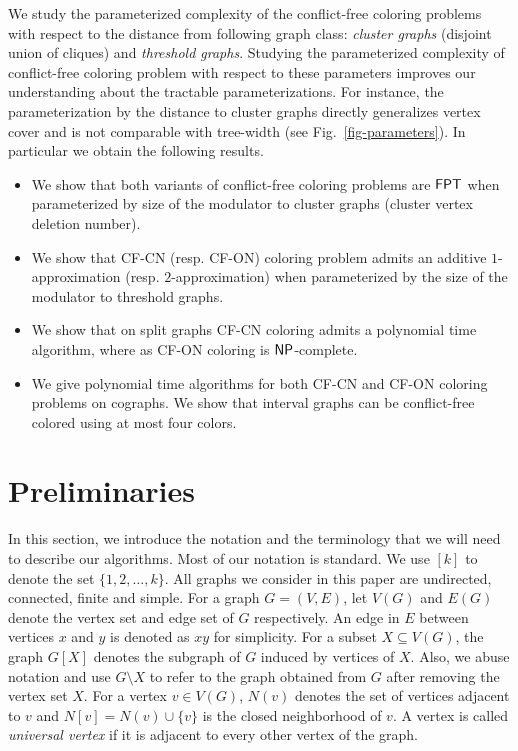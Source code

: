 \documentclass[svgnames]{llncs}
\newcommand{\NP}{\ensuremath{\sf{NP}}\xspace}
\newcommand{\fpt}{\ensuremath{\sf{FPT}}\xspace}
\newcommand{\cfcn}{\textsc {CF-CN}}
\newcommand{\cfon}{\textsc {CF-ON}}
\begin{document}
We study the parameterized complexity of the conflict-free coloring problems with respect to the distance from following graph class: \emph{cluster graphs} (disjoint union of cliques) and \emph{threshold graphs}. 
Studying the parameterized complexity of conflict-free coloring problem with respect to these parameters improves our understanding about the tractable parameterizations. 
For instance, the parameterization by the distance to cluster graphs directly generalizes vertex cover and is not comparable with tree-width (see Fig.~\ref{fig-parameters}). 
In particular we obtain the following results.
\vspace{-0.2cm}
\begin{itemize}
\item We show that both variants of conflict-free coloring problems are \fpt{} when parameterized by size of the modulator to cluster graphs (cluster vertex deletion number).
\item We show that \cfcn{} (resp. \cfon{}) coloring problem admits an additive $1$-approximation (resp. $2$-approximation) when parameterized by the size of the modulator to threshold graphs.
\item We show that on split graphs \cfcn{} coloring admits a polynomial time algorithm, where as \cfon{} coloring is $\NP$-complete.
\item We give polynomial time algorithms for both  \cfcn{} and \cfon{} coloring problems on cographs.
We show that interval graphs can be conflict-free colored using at most four colors.  
\end{itemize}

\section{Preliminaries}

In this section, we introduce the notation and the terminology that we will need to describe our algorithms. Most of our notation is standard. We use $[k]$ to denote the set $\{1,2,\ldots,k\}$. All graphs we consider in this paper are undirected, connected, finite and simple.
For a  graph $G=(V,E)$, let $V(G)$ and $E(G)$ denote the vertex set and edge set of $G$ respectively.
An edge in $E$ between vertices $x$ and $y$ is denoted as $xy$ for simplicity. 
For a  subset $X \subseteq V(G)$, the graph $G[X]$ denotes the subgraph of $G$ induced by vertices of $X$. Also, we abuse notation and use $G \setminus X$ to refer to the graph obtained from $G$ after removing the vertex set $X$. 
For a vertex $v\in V(G)$,
$N(v)$ denotes the set of vertices adjacent to $v$ and $N[v] = N(v) \cup \{v\}$ is the closed neighborhood of $v$. 
A vertex is called \emph{universal vertex} if it is adjacent to every other vertex of the graph.
\end{document}
